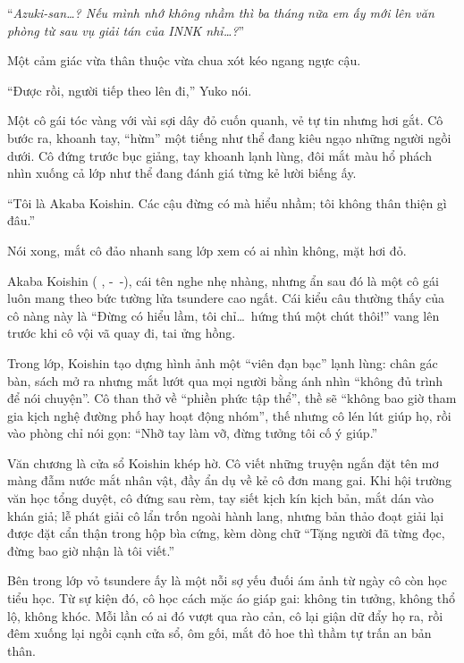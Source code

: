 \documentclass[../main.tex]{subfiles}
\begin{document}
``\textit{Azuki-san\dots? Nếu mình nhớ không nhầm thì ba tháng nữa em ấy mới lên văn phòng từ sau vụ giải tán của INNK nhỉ\dots?}''

Một cảm giác vừa thân thuộc vừa chua xót kéo ngang ngực cậu.

``Được rồi, người tiếp theo lên đi,'' Yuko nói.

Một cô gái tóc vàng với vài sợi dây đỏ cuốn quanh, vẻ tự tin nhưng hơi gắt. Cô bước ra, khoanh tay, ``hừm'' một tiếng như thể đang kiêu ngạo những người ngồi dưới. Cô đứng trước bục giảng, tay khoanh lạnh lùng, đôi mắt màu hổ phách nhìn xuống cả lớp như thể đang đánh giá từng kẻ lười biếng ấy.

``Tôi là Akaba Koishin. Các cậu đừng có mà hiểu nhầm; tôi không thân thiện gì đâu.''

Nói xong, mắt cô đảo nhanh sang lớp xem có ai nhìn không, mặt hơi đỏ.

\chrint

Akaba Koishin ( , -\ -), cái tên nghe nhẹ nhàng, nhưng ẩn sau đó là một cô gái luôn mang theo bức tường lửa tsundere cao ngất. Cái kiểu câu thường thấy của cô nàng này là ``Đừng có hiểu lầm, tôi chỉ\dots\ hứng thú một chút thôi!'' vang lên trước khi cô vội vã quay đi, tai ửng hồng.

Trong lớp, Koishin tạo dựng hình ảnh một ``viên đạn bạc'' lạnh lùng: chân gác bàn, sách mở ra nhưng mắt lướt qua mọi người bằng ánh nhìn ``không đủ trình để nói chuyện''. Cô than thở về ``phiền phức tập thể'', thề sẽ ``không bao giờ tham gia kịch nghệ đường phố hay hoạt động nhóm'', thế nhưng cô lén lút giúp họ, rồi vào phòng chỉ nói gọn: ``Nhỡ tay làm vỡ, đừng tưởng tôi cố ý giúp.''

Văn chương là cửa sổ Koishin khép hờ. Cô viết những truyện ngắn đặt tên mơ màng đẫm nước mắt nhân vật, đầy ẩn dụ về kẻ cô đơn mang gai. Khi hội trường văn học tổng duyệt, cô đứng sau rèm, tay siết kịch kín kịch bản, mắt dán vào khán giả; lễ phát giải cô lẩn trốn ngoài hành lang, nhưng bản thảo đoạt giải lại được đặt cẩn thận trong hộp bìa cứng, kèm dòng chữ ``Tặng người đã từng đọc, đừng bao giờ nhận là tôi viết.''

Bên trong lớp vỏ tsundere ấy là một nỗi sợ yếu đuối ám ảnh từ ngày cô còn học tiểu học. Từ sự kiện đó, cô học cách mặc áo giáp gai: không tin tưởng, không thổ lộ, không khóc. Mỗi lần có ai đó vượt qua rào cản, cô lại giận dữ đẩy họ ra, rồi đêm xuống lại ngồi cạnh cửa sổ, ôm gối, mắt đỏ hoe thì thầm tự trấn an bản thân.
\end{document}
